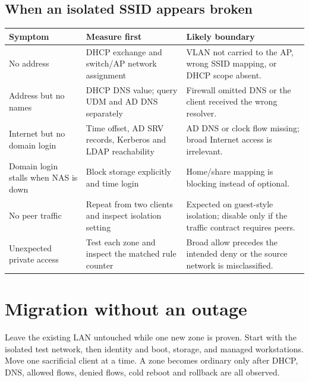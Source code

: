 \subsection*{When an isolated SSID appears broken}
\begin{tabularx}{\linewidth}{@{}p{.22\linewidth}p{.29\linewidth}L@{}}
\toprule
\textbf{Symptom} & \textbf{Measure first} & \textbf{Likely boundary}\\
\midrule
No address & DHCP exchange and switch/AP network assignment & VLAN not carried to the AP, wrong SSID mapping, or DHCP scope absent.\\
Address but no names & DHCP DNS value; query UDM and AD DNS separately & Firewall omitted DNS or the client received the wrong resolver.\\
Internet but no domain login & Time offset, AD SRV records, Kerberos and LDAP reachability & AD DNS or clock flow missing; broad Internet access is irrelevant.\\
Domain login stalls when NAS is down & Block storage explicitly and time login & Home/share mapping is blocking instead of optional.\\
No peer traffic & Repeat from two clients and inspect isolation setting & Expected on guest-style isolation; disable only if the traffic contract requires peers.\\
Unexpected private access & Test each zone and inspect the matched rule counter & Broad allow precedes the intended deny or the source network is misclassified.\\
\bottomrule
\end{tabularx}

\section{Migration without an outage}
Leave the existing LAN untouched while one new zone is proven.  Start with the
isolated test network, then identity and boot, storage, and managed
workstations.  Move one sacrificial client at a time.  A zone becomes ordinary
only after DHCP, DNS, allowed flows, denied flows, cold reboot and rollback are
all observed.

